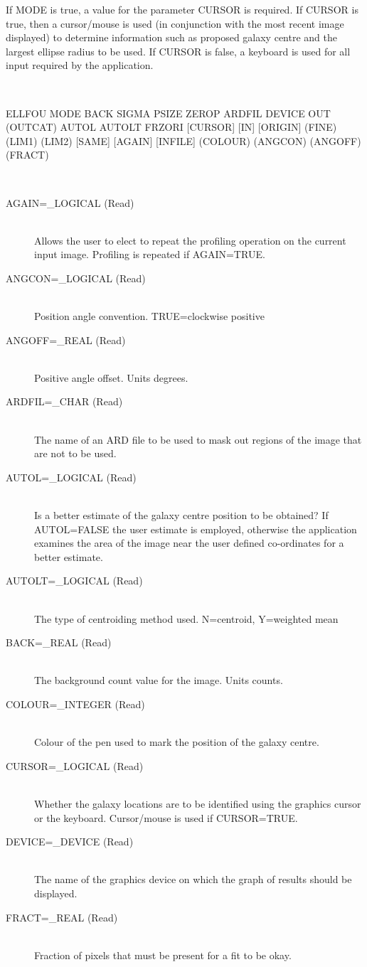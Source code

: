\documentclass[twoside,11pt]{article}
\newcommand{\LineBreak}{\hfill\break\hbox{}\qquad}
\newcommand{\sstusage}[1]{\item[Usage:] \mbox{}
\\[1.3ex]{\raggedright \ssttt #1}}
\newcommand{\sstparameters}[1]{
   \item[Parameters:] \mbox{} \\
   \vspace{-3.5ex}
   \begin{description}
      #1
   \end{description}
}
\newcommand{\sstsubsection}[1]{ \item[{#1}] \mbox{} \\}
\newcommand{\sstusage}[1]{\item[Usage:]
      \begin{description}
         {\ssttt #1}
      \end{description}
      \\
   }
\newcommand{\sstparameters}[1]{
      \item[Parameters:] \\
      \begin{description}
         #1
      \end{description}
      \\
   }
\newcommand{\sstsubsection}[1]{\item[{#1}]}
\begin{document}
{{      If MODE is true, a value for the parameter CURSOR
      is required. If CURSOR is true, then a cursor/mouse is used (in
      conjunction with the most recent image displayed) to determine
      information such as proposed galaxy centre and the largest
      ellipse radius to be used. If CURSOR is false, a keyboard is
      used for all input required by the application.
   }
   \sstusage{
      ELLFOU MODE BACK SIGMA PSIZE ZEROP ARDFIL DEVICE OUT (OUTCAT)
\LineBreak
             AUTOL AUTOLT FRZORI [CURSOR] [IN] [ORIGIN] (FINE)
\LineBreak
             [RLIM] (LIM1) (LIM2) [SAME] [AGAIN] [INFILE]
\LineBreak
             [IMGDEV] (COLOUR) (ANGCON) (ANGOFF) (FRACT)
   }
   \sstparameters{
      \sstsubsection{
         AGAIN=\_LOGICAL (Read)
      }{
         Allows the user to elect to repeat the profiling operation
         on the current input image. Profiling is repeated if
         AGAIN=TRUE.
      }
      \sstsubsection{
         ANGCON=\_LOGICAL (Read)
      }{
         Position angle convention. TRUE=clockwise positive
      }
      \sstsubsection{
         ANGOFF=\_REAL (Read)
      }{
         Positive angle offset. Units degrees.
      }
      \sstsubsection{
         ARDFIL=\_CHAR (Read)
      }{
         The name of an ARD file to be used to mask out regions of the
         image that are not to be used.
      }
      \sstsubsection{
         AUTOL=\_LOGICAL (Read)
      }{
         Is a better estimate of the galaxy centre position to be
         obtained? If AUTOL=FALSE the user estimate is employed,
         otherwise the application examines the area of the image near
         the user defined co-ordinates for a better estimate.
      }
      \sstsubsection{
         AUTOLT=\_LOGICAL (Read)
      }{
         The type of centroiding method used. N=centroid, Y=weighted mean
      }
      \sstsubsection{
         BACK=\_REAL (Read)
      }{
         The background count value for the image. Units counts.
      }
      \sstsubsection{
         COLOUR=\_INTEGER (Read)
      }{
         Colour of the pen used to mark the position of the galaxy
         centre.
      }
      \sstsubsection{
         CURSOR=\_LOGICAL (Read)
      }{
         Whether the galaxy locations are to be identified using the
         graphics cursor or the keyboard. Cursor/mouse is used if
         CURSOR=TRUE.
      }
      \sstsubsection{
         DEVICE=\_DEVICE (Read)
      }{
         The name of the graphics device on which the graph of results
         should be displayed.
      }
      \sstsubsection{
         FRACT=\_REAL (Read)
      }{
         Fraction of pixels that must be present for a fit to be okay.
}}}
\end{document}
